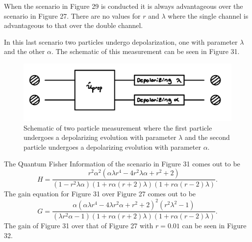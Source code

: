 \documentclass[twocolumn]{article}
\begin{document}
\newline
When the scenario in Figure 29 is conducted it is always advantageous over the scenario in Figure 27. There are no values for $r$ and $\lambda$ where the single channel is advantageous to that over the double channel.

In this last scenario two particles undergo depolarization, one with parameter $\lambda$ and the other $\alpha$. The schematic of this measurement can be seen in Figure 31.
\begin{figure}[h]
\begin{center}
\includegraphics[width=0.65\linewidth]{Depolarizing-Double-Channel-Alpha-and-Lambda-Schematic.jpg}
\caption{Schematic of two particle measurement where the first particle undergoes a depolarizing evolution with parameter $\lambda$ and the second particle undergoes a depolarizing evolution with parameter $\alpha$.}
\end{center}
\end{figure}
\newline
The Quantum Fisher Information of the scenario in Figure 31 comes out to be
\begin{equation}\label{eq:109}
H=\frac{r^2\alpha^2(\alpha\lambda r^4-4r^2\lambda\alpha+r^2+2)}{(1-r^2\lambda\alpha)(1+r\alpha(r+2)\lambda)(1+r\alpha(r-2)\lambda)}.
\end{equation}
The gain equation for Figure 31 over Figure 27 comes out to be
\begin{equation}\label{eq:110}
G=\frac{\alpha(\alpha\lambda r^4-4\lambda r^2\alpha+r^2+2)^2(r^2\lambda^2-1)}{(\lambda r^2\alpha-1)(1+r\alpha(r+2)\lambda)(1+r\alpha(r-2)\lambda)}.
\end{equation}
The gain of Figure 31 over that of Figure 27 with $r=0.01$ can be seen in Figure 32.
\end{document}
